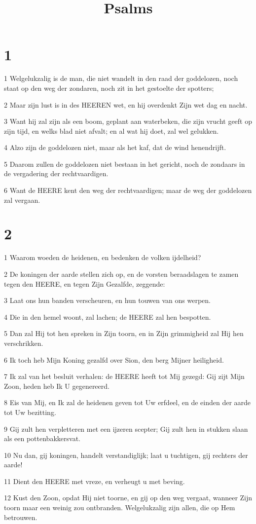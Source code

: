 

\title{Psalms}



\chapter{1}

\par 1 Welgelukzalig is de man, die niet wandelt in den raad der goddelozen, noch staat op den weg der zondaren, noch zit in het gestoelte der spotters;
\par 2 Maar zijn lust is in des HEEREN wet, en hij overdenkt Zijn wet dag en nacht.
\par 3 Want hij zal zijn als een boom, geplant aan waterbeken, die zijn vrucht geeft op zijn tijd, en welks blad niet afvalt; en al wat hij doet, zal wel gelukken.
\par 4 Alzo zijn de goddelozen niet, maar als het kaf, dat de wind henendrijft.
\par 5 Daarom zullen de goddelozen niet bestaan in het gericht, noch de zondaars in de vergadering der rechtvaardigen.
\par 6 Want de HEERE kent den weg der rechtvaardigen; maar de weg der goddelozen zal vergaan.

\chapter{2}

\par 1 Waarom woeden de heidenen, en bedenken de volken ijdelheid?
\par 2 De koningen der aarde stellen zich op, en de vorsten beraadslagen te zamen tegen den HEERE, en tegen Zijn Gezalfde, zeggende:
\par 3 Laat ons hun banden verscheuren, en hun touwen van ons werpen.
\par 4 Die in den hemel woont, zal lachen; de HEERE zal hen bespotten.
\par 5 Dan zal Hij tot hen spreken in Zijn toorn, en in Zijn grimmigheid zal Hij hen verschrikken.
\par 6 Ik toch heb Mijn Koning gezalfd over Sion, den berg Mijner heiligheid.
\par 7 Ik zal van het besluit verhalen: de HEERE heeft tot Mij gezegd: Gij zijt Mijn Zoon, heden heb Ik U gegenereerd.
\par 8 Eis van Mij, en Ik zal de heidenen geven tot Uw erfdeel, en de einden der aarde tot Uw bezitting.
\par 9 Gij zult hen verpletteren met een ijzeren scepter; Gij zult hen in stukken slaan als een pottenbakkersvat.
\par 10 Nu dan, gij koningen, handelt verstandiglijk; laat u tuchtigen, gij rechters der aarde!
\par 11 Dient den HEERE met vreze, en verheugt u met beving.
\par 12 Kust den Zoon, opdat Hij niet toorne, en gij op den weg vergaat, wanneer Zijn toorn maar een weinig zou ontbranden. Welgelukzalig zijn allen, die op Hem betrouwen.

